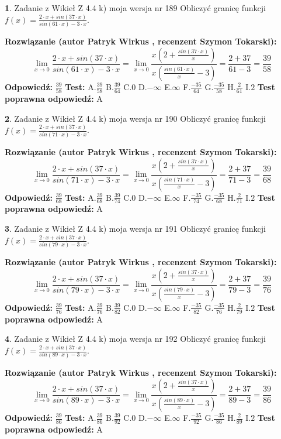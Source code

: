 \documentclass[12pt, a4paper]{article}
\theoremstyle{definition} %
\newtheorem{zad}{}
\newcommand{\zadStart}[1]{\begin{zad}#1\newline}
\newcommand{\zadStop}{\end{zad}}
\newcommand{\rozwStart}[2]{\noindent \textbf{Rozwiązanie (autor #1 , recenzent #2): }\newline}
\newcommand{\rozwStop}{\newline}
\newcommand{\odpStart}{\noindent \textbf{Odpowiedź:}\newline}
\newcommand{\odpStop}{\newline}
\newcommand{\testStart}{\noindent \textbf{Test:}\newline}
\newcommand{\testStop}{\newline}
\newcommand{\kluczStart}{\noindent \textbf{Test poprawna odpowiedź:}\newline}
\newcommand{\kluczStop}{\newline}
\begin{document}
\zadStart{Zadanie z Wikieł Z 4.4 k) moja wersja nr 189}
Obliczyć granicę funkcji $f(x)=\frac{2\cdot x +sin(37\cdot x)}{sin(61\cdot x) -3\cdot x}$.
\zadStop
\rozwStart{Patryk Wirkus}{Szymon Tokarski}
$$\lim\limits_{x\to 0}\frac{2\cdot x +sin(37\cdot x)}{sin(61\cdot x) -3\cdot x}
=\lim\limits_{x\to 0}\frac{x(2+\frac{sin(37\cdot x)}{x})}{x(\frac{sin(61\cdot x)}{x}-3)}
=\frac{2+37}{61-3} = \frac{39}{58}$$
\rozwStop
\odpStart
$\frac{39}{58}$
\odpStop
\testStart
A.$\frac{39}{58}$
B.$\frac{39}{64}$
C.$0$
D.$-\infty$
E.$\infty$
F.$\frac{-35}{64}$
G.$\frac{-35}{58}$
H.$\frac{2}{61}$
I.$2$
\testStop
\kluczStart
A
\kluczStop



\zadStart{Zadanie z Wikieł Z 4.4 k) moja wersja nr 190}
Obliczyć granicę funkcji $f(x)=\frac{2\cdot x +sin(37\cdot x)}{sin(71\cdot x) -3\cdot x}$.
\zadStop
\rozwStart{Patryk Wirkus}{Szymon Tokarski}
$$\lim\limits_{x\to 0}\frac{2\cdot x +sin(37\cdot x)}{sin(71\cdot x) -3\cdot x}
=\lim\limits_{x\to 0}\frac{x(2+\frac{sin(37\cdot x)}{x})}{x(\frac{sin(71\cdot x)}{x}-3)}
=\frac{2+37}{71-3} = \frac{39}{68}$$
\rozwStop
\odpStart
$\frac{39}{68}$
\odpStop
\testStart
A.$\frac{39}{68}$
B.$\frac{39}{74}$
C.$0$
D.$-\infty$
E.$\infty$
F.$\frac{-35}{74}$
G.$\frac{-35}{68}$
H.$\frac{2}{71}$
I.$2$
\testStop
\kluczStart
A
\kluczStop



\zadStart{Zadanie z Wikieł Z 4.4 k) moja wersja nr 191}
Obliczyć granicę funkcji $f(x)=\frac{2\cdot x +sin(37\cdot x)}{sin(79\cdot x) -3\cdot x}$.
\zadStop
\rozwStart{Patryk Wirkus}{Szymon Tokarski}
$$\lim\limits_{x\to 0}\frac{2\cdot x +sin(37\cdot x)}{sin(79\cdot x) -3\cdot x}
=\lim\limits_{x\to 0}\frac{x(2+\frac{sin(37\cdot x)}{x})}{x(\frac{sin(79\cdot x)}{x}-3)}
=\frac{2+37}{79-3} = \frac{39}{76}$$
\rozwStop
\odpStart
$\frac{39}{76}$
\odpStop
\testStart
A.$\frac{39}{76}$
B.$\frac{39}{82}$
C.$0$
D.$-\infty$
E.$\infty$
F.$\frac{-35}{82}$
G.$\frac{-35}{76}$
H.$\frac{2}{79}$
I.$2$
\testStop
\kluczStart
A
\kluczStop



\zadStart{Zadanie z Wikieł Z 4.4 k) moja wersja nr 192}
Obliczyć granicę funkcji $f(x)=\frac{2\cdot x +sin(37\cdot x)}{sin(89\cdot x) -3\cdot x}$.
\zadStop
\rozwStart{Patryk Wirkus}{Szymon Tokarski}
$$\lim\limits_{x\to 0}\frac{2\cdot x +sin(37\cdot x)}{sin(89\cdot x) -3\cdot x}
=\lim\limits_{x\to 0}\frac{x(2+\frac{sin(37\cdot x)}{x})}{x(\frac{sin(89\cdot x)}{x}-3)}
=\frac{2+37}{89-3} = \frac{39}{86}$$
\rozwStop
\odpStart
$\frac{39}{86}$
\odpStop
\testStart
A.$\frac{39}{86}$
B.$\frac{39}{92}$
C.$0$
D.$-\infty$
E.$\infty$
F.$\frac{-35}{92}$
G.$\frac{-35}{86}$
H.$\frac{2}{89}$
I.$2$
\testStop
\kluczStart
A
\kluczStop
\end{document}

